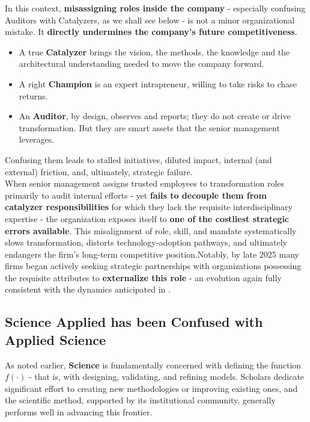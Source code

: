 \documentclass{article}
\begin{document}
In this context, \textbf{misassigning roles inside the company} - especially confusing Auditors with Catalyzers, as we shall see below - is not a minor organizational mistake. It \textbf{directly undermines the company’s future competitiveness}.\\
\begin{itemize}
    \item A true \textbf{Catalyzer} brings the vision, the methods, the knowledge and the architectural understanding needed to move the company forward.
    \item A right \textbf{Champion} is an expert intrapreneur, willing to take risks to chase returns.
    \item An \textbf{Auditor}, by design, observes and reports; they do not create or drive transformation. But they are smart assets that the senior management leverages.
\end{itemize}

Confusing them leads to stalled initiatives, diluted impact, internal (and external) friction, and, ultimately, strategic failure.\\

When senior management assigns trusted employees to transformation roles primarily to audit internal efforts - yet \textbf{fails to decouple them from catalyzer responsibilities} for which they lack the requisite interdisciplinary expertise - the organization exposes itself to \textbf{one of the costliest strategic errors available}. This misalignment of role, skill, and mandate systematically slows transformation, distorts technology-adoption pathways, and ultimately endangers the firm’s long-term competitive position.Notably, by late 2025 many firms began actively seeking strategic partnerships with organizations possessing the requisite attributes to \textbf{externalize this role} - an evolution again fully consistent with the dynamics anticipated in \cite{Digital Washing}.\\


\subsection{Science Applied has been Confused with Applied Science}
\label{subsection: Science Applied has been Confused with Applied Science}

As noted earlier, \textbf{Science} is fundamentally concerned with defining the function \begin{math} f(·)\end{math} - that is, with designing, validating, and refining models. Scholars dedicate significant effort to creating new methodologies or improving existing ones, and the scientific method, supported by its institutional community, generally performs well in advancing this frontier.\\
\end{document}
